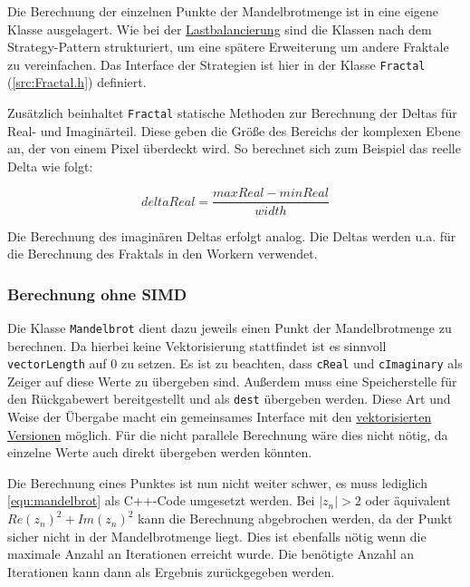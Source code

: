Die Berechnung der einzelnen Punkte der Mandelbrotmenge ist in eine eigene Klasse ausgelagert.
Wie bei der \hyperref[sec:load_balancing]{Lastbalancierung} sind die Klassen nach dem Strategy-Pattern strukturiert, um eine spätere Erweiterung um andere Fraktale zu vereinfachen.
Das Interface der Strategien ist hier in der Klasse \verb|Fractal| (\autoref{src:Fractal.h}) definiert.

\begin{figure}
	
\end{figure}

Zusätzlich beinhaltet \verb|Fractal| statische Methoden zur Berechnung der Deltas für Real- und Imaginärteil.
Diese geben die Größe des Bereichs der komplexen Ebene an, der von einem Pixel überdeckt wird.
So berechnet sich zum Beispiel das reelle Delta wie folgt:

\begin{equation*}
	deltaReal = \frac{maxReal - minReal}{width}
\end{equation*}

Die Berechnung des imaginären Deltas erfolgt analog.
Die Deltas werden u.a. für die Berechnung des Fraktals in den Workern verwendet.

\subsubsection{Berechnung ohne SIMD}

Die Klasse \verb|Mandelbrot| dient dazu jeweils einen Punkt der Mandelbrotmenge zu berechnen.
Da hierbei keine Vektorisierung stattfindet ist es sinnvoll \verb|vectorLength| auf 0 zu setzen.
Es ist zu beachten, dass \verb|cReal| und \verb|cImaginary| als Zeiger auf diese Werte zu übergeben sind.
Außerdem muss eine Speicherstelle für den Rückgabewert bereitgestellt und als \verb|dest| übergeben werden.
Diese Art und Weise der Übergabe macht ein gemeinsames Interface mit den \hyperref[subsec:simd]{vektorisierten Versionen} möglich.
Für die nicht parallele Berechnung wäre dies nicht nötig, da einzelne Werte auch direkt übergeben werden könnten.

Die Berechnung eines Punktes ist nun nicht weiter schwer, es muss lediglich \autoref{equ:mandelbrot} als C++-Code umgesetzt werden.
Bei $|z_n| > 2$ oder äquivalent $Re(z_n)^2 + Im(z_n)^2$ kann die Berechnung abgebrochen werden, da der Punkt sicher nicht in der Mandelbrotmenge liegt.
Dies ist ebenfalls nötig wenn die maximale Anzahl an Iterationen erreicht wurde.
Die benötigte Anzahl an Iterationen kann dann als Ergebnis zurückgegeben werden.

